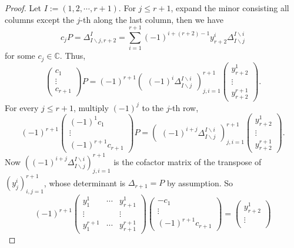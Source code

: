 \documentclass[10pt]{article} %
\theoremstyle{definition}
\begin{document}
\begin{proof}
Let $I:=(1,2,\cdots,r+1)$. For $j\leq r+1$, expand the minor consisting all columns except the $j$-th along the last column, then we have
$$c_jP=\Delta^{I}_{I\backslash j, r+2}=\sum_{i=1}^{r+1}(-1)^{i+(r+2)-1}y^i_{r+2}\Delta^{I\backslash i}_{I\backslash j}$$
for some $c_j\in\mathbb{C}$. Thus,
$$\begin{pmatrix}
c_1\\
\vdots\\
c_{r+1}
\end{pmatrix}P=
(-1)^{r+1}\begin{pmatrix}
(-1)^{i}\Delta^{I\backslash i}_{I\backslash j}
\end{pmatrix}_{j,i=1}^{r+1}
\begin{pmatrix}
y^1_{r+2}\\
\vdots\\
y^{r+1}_{r+2}
\end{pmatrix}.$$
For every $j\leq r+1$, multiply $(-1)^j$ to the $j$-th row,
\begin{equation}\label{cofactor}
    (-1)^{r+1}\begin{pmatrix}
(-1)^1 c_1\\
\vdots\\
(-1)^{r+1} c_{r+1}
\end{pmatrix}P=
\begin{pmatrix}
(-1)^{i+j}\Delta^{I\backslash i}_{I\backslash j}
\end{pmatrix}_{j,i=1}^{r+1}
\begin{pmatrix}
y^1_{r+2}\\
\vdots\\
y^{r+1}_{r+2}
\end{pmatrix}.
\end{equation}
Now $((-1)^{i+j}\Delta^{I\backslash i}_{I\backslash j})_{j,i=1}^{r+1}$ is the cofactor matrix of the transpose of $(y^i_j)_{i,j=1}^{r+1}$, whose determinant is $\Delta_{r+1}=P$ by assumption. So
$$(-1)^{r+1}
\begin{pmatrix}
y^1_1&\cdots&y^1_{r+1}\\
\vdots & &\vdots\\
y^{r+1}_1&\cdots&y^{r+1}_{r+1}
\end{pmatrix}
\begin{pmatrix}
-c_1\\
\vdots\\
(-1)^{r+1} c_{r+1}
\end{pmatrix}=
\begin{pmatrix}
y^1_{r+2}\\
\vdots\\

\end{pmatrix}$$
\end{proof}
\end{document}
